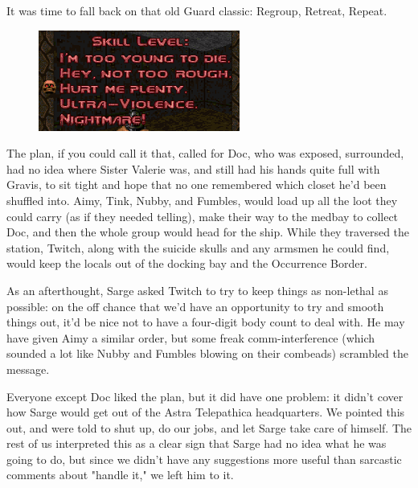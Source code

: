 It was time to fall back on that old Guard classic: 
Regroup, Retreat, Repeat.

\begin{figure}
	\begin{center}
		\includegraphics[width=\figwidth]{pics/14/25.png}
	\end{center}
\end{figure}
The plan, if you could call it that, called for Doc, who was exposed, surrounded, had no idea where Sister Valerie was, and still had his hands quite full with Gravis, to sit tight and hope that no one remembered which closet he'd been shuffled into. 
Aimy, Tink, Nubby, and Fumbles, would load up all the loot they could carry (as if they needed telling), make their way to the medbay to collect Doc, and then the whole group would head for the ship. 
While they traversed the station, Twitch, along with the suicide skulls and any armsmen he could find, would keep the locals out of the docking bay and the Occurrence Border. 


As an afterthought, Sarge asked Twitch to try to keep things as non-lethal as possible: 
on the off chance that we'd have an opportunity to try and smooth things out, it'd be nice not to have a four-digit body count to deal with. 
He may have given Aimy a similar order, but some freak comm-interference (which sounded a lot like Nubby and Fumbles blowing on their combeads) scrambled the message.

Everyone except Doc liked the plan, but it did have one problem: 
it didn't cover how Sarge would get out of the Astra Telepathica headquarters. 
We pointed this out, and were told to shut up, do our jobs, and let Sarge take care of himself. 
The rest of us interpreted this as a clear sign that Sarge had no idea what he was going to do, but since we didn't have any suggestions more useful than sarcastic comments about "handle it," we left him to it.

